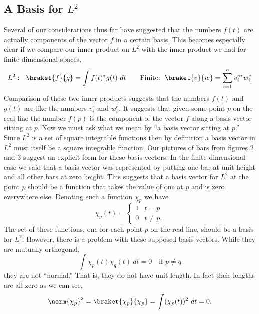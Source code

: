 \subsection{A Basis for $L^2$}
Several of our considerations thus far have suggested that the numbers $f(t)$ are actually components of the vector $f$ in a certain basis.  This becomes especially clear if we compare our inner product on $L^2$ with the inner product we had for finite dimensional spaces,
\begin{displaymath} L^2:~~\braket{f}{g} = \int f(t)^*g(t)~dt \qquad \textrm{Finite:}~~\braket{v}{w} = \sum _{i=1}^n v^{e *}_i w^e_i \end{displaymath}
Comparison of these two inner products suggests that the numbers $f(t)$ and $g(t)$ are like the numbers $v^e_i$ and $w^e_i$.  It suggests that given some point $p$ on the real line the number $f(p)$ is the component of the vector $f$ along a basis vector sitting at $p$.  Now we must ask what we mean by ``a basis vector sitting at $p$.''  Since $L^2$ is a set of square integrable functions then by definition a basis vector in $L^2$ must itself be a square integrable function.  Our pictures of bars from figures 2 and 3 suggest an explicit form for these basis vectors.  In the finite dimensional case we said that a basis vector was represented by putting one bar at unit height and all other bars at zero height.  This suggests that a basis vector for $L^2$ at the point $p$ should be a function that takes the value of one at $p$ and is zero everywhere else.  Denoting such a function $\chi_p$ we have
\begin{displaymath} \chi _{p}(t) = \left\{ \begin{array}{ll} 1 & t = p \\ 0 & t \neq p. \end{array} \right. \end{displaymath}
The set of these functions, one for each point $p$ on the real line, should be a basis for $L^2$.  However, there is a problem with these supposed basis vectors.  While they are mutually orthogonal,
\begin{displaymath} \int \chi _{p}(t) \chi _{q}(t) ~dt = 0 \quad \textrm{if $p\neq q$} \end{displaymath}
they are not ``normal.''  That is, they do not have unit length.  In fact their lengths are all zero as we can see,
\begin{displaymath} \norm{\chi _{p}}^2 = \braket{\chi _{p}}{\chi _{p}} = \int (\chi _{p}(t))^2 ~dt = 0. \end{displaymath}
